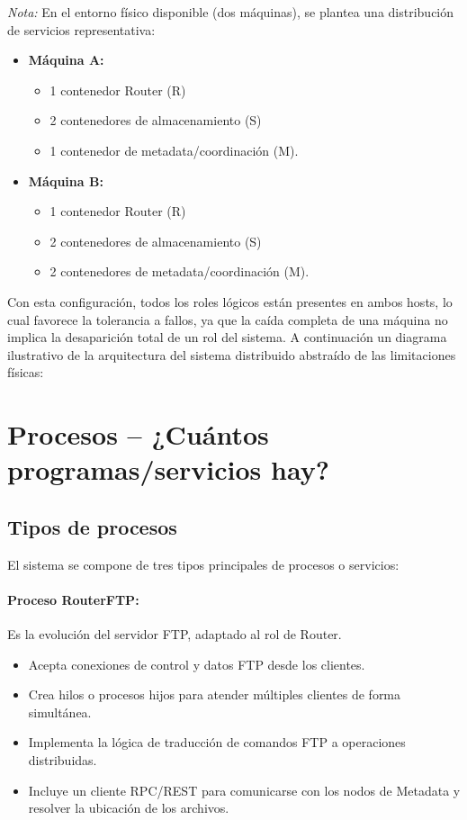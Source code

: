 \documentclass{article}
\begin{document}
\textit{Nota:} En el entorno físico disponible (dos máquinas), se plantea una distribución de servicios representativa:
    \begin{itemize}
        \item \textbf{Máquina A:}
        \begin{itemize}
            \item 1 contenedor Router (R)
            \item 2 contenedores de almacenamiento (S)
            \item 1 contenedor de metadata/coordinación (M).
        \end{itemize}
        \item \textbf{Máquina B:}
        \begin{itemize}
            \item 1 contenedor Router (R)
            \item 2 contenedores de almacenamiento (S)
            \item 2 contenedores de metadata/coordinación (M).
        \end{itemize}
    \end{itemize}
Con esta configuración, todos los roles lógicos están presentes en ambos hosts, lo cual favorece la tolerancia a fallos, ya que la caída completa de una máquina no implica la desaparición total de un rol del sistema. A continuación un diagrama ilustrativo de la arquitectura del sistema distribuido abstraído de las limitaciones físicas:



\section{Procesos – ¿Cuántos programas/servicios hay?}

\subsection{Tipos de procesos}
El sistema se compone de tres tipos principales de procesos o servicios:

\paragraph{Proceso RouterFTP:}
Es la evolución del servidor FTP, adaptado al rol de Router.
\begin{itemize}
    \item Acepta conexiones de control y datos FTP desde los clientes.
    \item Crea hilos o procesos hijos para atender múltiples clientes de forma simultánea.
    \item Implementa la lógica de traducción de comandos FTP a operaciones distribuidas.
    \item Incluye un cliente RPC/REST para comunicarse con los nodos de Metadata y resolver la ubicación de los archivos.
\end{itemize}
\end{document}
